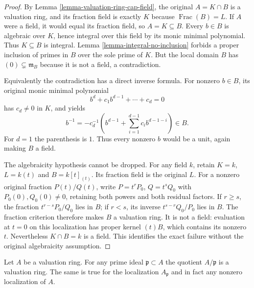 \begin{proof}
By Lemma \ref{lemma-valuation-ring-cap-field},
the original $A=K\cap B$ is
a valuation ring, and its
fraction field is exactly $K$
because $\operatorname{Frac}(B)=L$.
If $A$ were a field, it
would equal its fraction field,
so $A=K\subseteq B$.
Every $b\in B$ is algebraic
over $K$, hence integral over
this field by its monic
minimal polynomial. Thus
$K\subseteq B$ is integral.
Lemma \ref{lemma-integral-no-inclusion}
forbids a proper inclusion
of primes in $B$ over
the sole prime of $K$.
But the local domain $B$
has $(0)\subsetneq\mathfrak m_B$
because it is not a field,
a contradiction.

Equivalently the contradiction
has a direct inverse formula.
For nonzero $b\in B$, its
original monic minimal polynomial
$$
b^d+c_1b^{d-1}+\cdots+c_d=0
$$
has $c_d\neq0$ in $K$,
and yields
$$
b^{-1}=-c_d^{-1}
\left(b^{d-1}+\sum_{i=1}^{d-1}c_i b^{d-1-i}\right)\in B.
$$
For $d=1$ the parenthesis
is $1$. Thus every nonzero
$b$ would be a unit,
again making $B$ a field.

The algebraicity hypothesis
cannot be dropped. For any
field $k$, retain
$K=k$, $L=k(t)$ and
$B=k[t]_{(t)}$. Its fraction
field is the original $L$.
For a nonzero original
fraction $P(t)/Q(t)$, write
$P=t^rP_0$, $Q=t^sQ_0$
with $P_0(0),Q_0(0)\neq0$,
retaining both powers and
both residual factors.
If $r\geq s$, the fraction
$t^{r-s}P_0/Q_0$ lies in
$B$; if $r<s$, its inverse
$t^{s-r}Q_0/P_0$ lies in
$B$. The fraction criterion
therefore makes $B$ a
valuation ring. It is not
a field: evaluation at $t=0$
on this localization has
proper kernel $(t)B$, which
contains its nonzero $t$.
Nevertheless $K\cap B=k$
is a field. This identifies
the exact failure without
the original algebraicity
assumption.
\end{proof}

\begin{lemma}
\label{lemma-make-valuation-rings}
Let $A$ be a valuation ring. For any prime ideal $\mathfrak p \subset A$ the
quotient $A/\mathfrak p$ is a valuation ring. The same is true for the
localization $A_\mathfrak p$ and in fact any nonzero localization of $A$.
\end{lemma}

